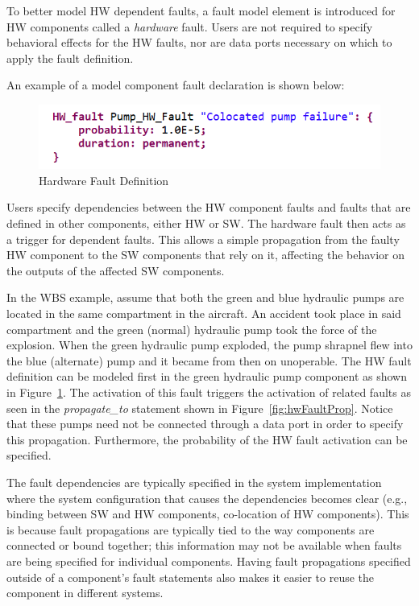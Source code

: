 To better model HW dependent faults, a fault model element is introduced for HW components called a \textit{hardware} fault. Users are not required to specify behavioral effects for the HW faults, nor are data ports necessary on which to apply the fault definition. 

An example of a model component fault declaration is shown below:
\begin{figure}[h!]
	\vspace{-0.2in}
	\begin{center}
	\includegraphics[width=.7\textwidth]{images/hw_fault2.png}
	\end{center}
	\vspace{-0.3in}
	\caption{Hardware Fault Definition}
	\label{fig:hwFault}
	\vspace{-0.2in}
\end{figure}

Users specify dependencies between the HW component faults and faults that are defined in other components, either HW or SW. The hardware fault then acts as a trigger for dependent faults. This allows a simple propagation from the faulty HW component to the SW components that rely on it, affecting the behavior on the outputs of the affected SW components.

In the WBS example, assume that both the green and blue hydraulic pumps are located in the same compartment in the aircraft. An accident took place in said compartment and the green (normal) hydraulic pump took the force of the explosion. When the green hydraulic pump exploded, the pump shrapnel flew into the blue (alternate) pump and it became from then on unoperable. The HW fault definition can be modeled first in the green hydraulic pump component as shown in Figure~\ref{fig:hwFault}. The activation of this fault triggers the activation of related faults as seen in the \textit{propagate\_to} statement shown in Figure~\ref{fig:hwFaultProp}. Notice that these pumps need not be connected through a data port in order to specify this propagation. Furthermore, the probability of the HW fault activation can be specified. 

The fault dependencies are typically specified in the system implementation where the system configuration that causes the dependencies becomes clear (e.g., binding between SW and HW components, co-location of HW components). This is because fault propagations are typically tied to the way components are connected or bound together; this information may not be available when faults are being specified for individual components. Having fault propagations specified outside of a component’s fault statements also makes it easier to reuse the component in different systems. 

